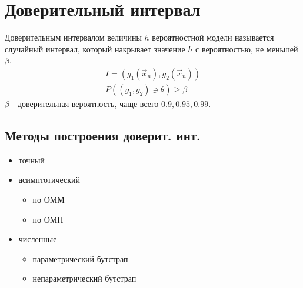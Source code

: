 \documentclass{article}
\begin{document}
\section{Доверительный интервал}
\begin{definition}
  Доверительным интервалом величины $h$ вероятностной модели называется
  случайный интервал, который накрывает значение $h$ с вероятностью,
  не меньшей $\beta$.
  \begin{gather*}
    I=(g_{1}(\vec{x}_n), g_2(\vec{x}_n)) \\ 
    P((g_1,g_2)\ni \theta) \ge \beta
  \end{gather*}
  $\beta$ - доверительная вероятность, чаще всего $0.9, 0.95, 0.99$.
\end{definition}

\subsection{Методы построения доверит. инт.}
\begin{itemize}
  \item точный
  \item асимптотический
    \begin{itemize}
      \item по ОММ
      \item по ОМП
    \end{itemize}
  \item численные
    \begin{itemize}
      \item параметрический бутстрап
      \item непараметрический бутстрап
    \end{itemize}
\end{itemize}
\end{document}
